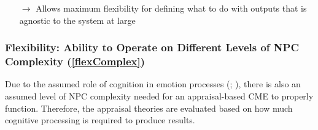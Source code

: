 \begin{itemize}
\begin{itemize}
\begin{itemize}
            \item [$\rightarrow$] Allows maximum flexibility for defining what
            to do with outputs that is agnostic to the system at large
        \end{itemize}
    \end{itemize}
\end{itemize}

\subsubsection{Flexibility: Ability to Operate on Different Levels of NPC
    Complexity (\ref{flexComplex})}
Due to the assumed role of cognition in emotion processes
(; ), there
is also an assumed level of NPC complexity needed for an appraisal-based CME to
properly function. Therefore, the appraisal theories are evaluated based on how
much cognitive processing is required to produce results.

